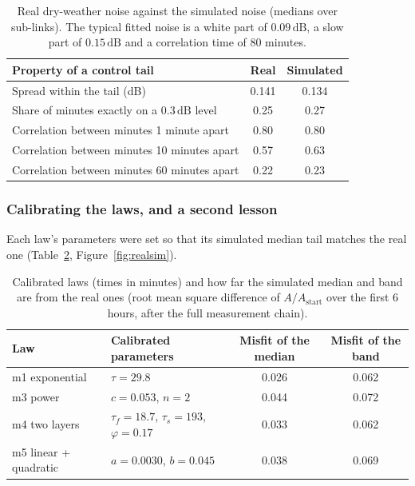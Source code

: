 \documentclass[11pt,a4paper]{article}
\newcommand{\dB}{\,\mathrm{dB}}
\newcommand{\Astart}{A_{\mathrm{start}}}
\begin{document}
\begin{table}[H]
\centering
\caption{Real dry-weather noise against the simulated noise (medians over sub-links). The typical fitted noise is a
white part of $0.09\dB$, a slow part of $0.15\dB$ and a correlation time of 80 minutes.}
\label{tab:noise}
\small
\begin{tabular}{@{}lcc@{}}
\toprule
Property of a control tail & Real & Simulated \\
\midrule
Spread within the tail (dB) & 0.141 & 0.134 \\
Share of minutes exactly on a $0.3\dB$ level & 0.25 & 0.27 \\
Correlation between minutes 1 minute apart & 0.80 & 0.80 \\
Correlation between minutes 10 minutes apart & 0.57 & 0.63 \\
Correlation between minutes 60 minutes apart & 0.22 & 0.23 \\
\bottomrule
\end{tabular}
\end{table}

\subsubsection*{Calibrating the laws, and a second lesson}

Each law's parameters were set so that its simulated median tail matches the real one
(Table~\ref{tab:calib}, Figure~\ref{fig:realsim}).

\begin{table}[H]
\centering
\caption{Calibrated laws (times in minutes) and how far the simulated median and band are from the real ones (root
mean square difference of $A/\Astart$ over the first 6 hours, after the full measurement chain).}
\label{tab:calib}
\small
\begin{tabular}{@{}llcc@{}}
\toprule
Law & Calibrated parameters & Misfit of the median & Misfit of the band \\
\midrule
m1 exponential & $\tau = 29.8$ & 0.026 & 0.062 \\
m3 power & $c = 0.053$, $n = 2$ & 0.044 & 0.072 \\
m4 two layers & $\tau_{f} = 18.7$, $\tau_{s} = 193$, $\varphi = 0.17$ & 0.033 & 0.062 \\
m5 linear + quadratic & $a = 0.0030$, $b = 0.045$ & 0.038 & 0.069 \\
\bottomrule
\end{tabular}
\end{table}
\end{document}
